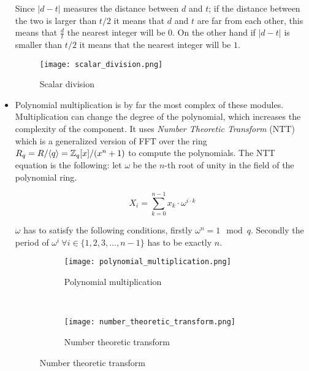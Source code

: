 \begin{itemize}
        Since $|d - t|$ measures the distance between $d$ and $t$; if the
        distance between the two is larger than $t / 2$ it means that $d$ and
        $t$ are far from each other, this means that $\frac{d}{t}$ the nearest
        integer will be $0$. On the other hand if $|d - t|$ is smaller than $t
        / 2$ it means that the nearest integer will be $1$.


        \begin{figure}[H]
            \centering
            \texttt{[image: scalar\_division.png]}
            \caption{Scalar division \citep{FPGA_Post_Quantum_Primitives}}
            \label{fig:scalar_div}
        \end{figure}


    \item
        Polynomial multiplication is by far the most complex of these modules.
        Multiplication can change the degree of the polynomial, which increases
        the complexity of the component. It uses \textit{Number Theoretic
        Transform} (NTT) which is a generalized version of FFT over the ring
        $R_q = R / \langle q \rangle = \mathbb{Z}_q [x] / (x^n + 1)$ to compute the
        polynomials. The NTT equation is the following: let $\omega$ be the
        $n$-th root of unity in the field of the polynomial ring.

        \[ X_i = \sum^{n-1}_{k=0} x_k \cdot \omega^{i\cdot k} \]

        $\omega$ has to satisfy the following conditions, firstly
        $\omega^n = 1 \mod q$. Secondly the period of
        $\omega^i \ \forall i \in \{1, 2, 3, \ldots, n - 1\}$ has to be exactly
        $n$.

        \begin{figure}[H]
            \centering
            \begin{subfigure}[b]{0.4\textwidth}
                \centering
                \texttt{[image: polynomial\_multiplication.png]}
                \caption{Polynomial multiplication \citep{FPGA_Post_Quantum_Primitives}}
                \label{fig:poly_mul}
            \end{subfigure}
            ~
            \begin{subfigure}[b]{0.4\textwidth}
                \centering
                \texttt{[image: number\_theoretic\_transform.png]}
                \caption{Number theoretic transform
                \citep{FPGA_Post_Quantum_Primitives}}
                \label{fig:ntt}
            \end{subfigure}
        \end{figure}

\end{itemize}




